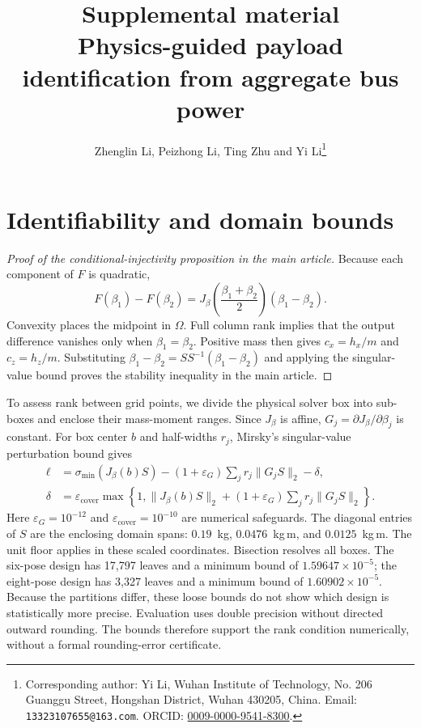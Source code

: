 \documentclass[12pt,a4paper]{article}
\title{Supplemental material\\[0.4em]\large Physics-guided payload identification from aggregate bus power}
\author{Zhenglin Li, Peizhong Li, Ting Zhu and Yi Li\thanks{Corresponding author: Yi Li, Wuhan Institute of Technology, No. 206 Guanggu Street, Hongshan District, Wuhan 430205, China. Email: \texttt{13323107655@163.com}. ORCID: \href{https://orcid.org/0009-0000-9541-8300}{0009-0000-9541-8300}.}}
\date{}
\begin{document}
\maketitle
\linenumbers
\setcounter{section}{0}
\setcounter{equation}{0}
\setcounter{table}{0}
\renewcommand{\thesection}{S\arabic{section}}
\renewcommand{\theequation}{S\arabic{equation}}
\renewcommand{\thetable}{S\arabic{table}}

\section{Identifiability and domain bounds}
\label{app:pvi_certificate}

\begin{proof}[Proof of the conditional-injectivity proposition in the main article]
Because each component of $F$ is quadratic,
\begin{equation}
F(\beta_1)-F(\beta_2)=
J_\beta\!\left(\frac{\beta_1+\beta_2}{2}\right)(\beta_1-\beta_2).
\label{eq:pvi_midpoint}
\end{equation}
Convexity places the midpoint in $\Omega$. Full column rank implies that
the output difference vanishes only when $\beta_1=\beta_2$. Positive mass
then gives $c_x=h_x/m$ and $c_z=h_z/m$. Substituting
$\beta_1-\beta_2=S S^{-1}(\beta_1-\beta_2)$ and applying the singular-value
bound proves the stability inequality in the main article.
\end{proof}

To assess rank between grid points, we divide the physical solver box into
sub-boxes and enclose their mass-moment ranges. Since $J_\beta$ is affine,
$G_j=\partial J_\beta/\partial\beta_j$ is constant. For box center $b$ and
half-widths $r_j$, Mirsky's singular-value perturbation bound gives
\begin{align}
\ell&=\sigma_{\min}(J_\beta(b)S)
-(1+\varepsilon_G)\sum_j r_j\|G_jS\|_2-\delta,
\label{eq:pvi_box_bound}\\
\delta&=\varepsilon_{\mathrm{cover}}\max\!\left\{
1,\|J_\beta(b)S\|_2+(1+\varepsilon_G)\sum_jr_j\|G_jS\|_2\right\}.
\label{eq:cover_numerical_margin}
\end{align}
Here $\varepsilon_G=10^{-12}$ and $\varepsilon_{\mathrm{cover}}=10^{-10}$
are numerical safeguards. The diagonal entries of $S$ are the enclosing
domain spans: $0.19$~kg, $0.0476$~kg\,m, and $0.0125$~kg\,m. The unit floor
applies in these scaled coordinates. Bisection resolves all boxes. The
six-pose design has 17,797 leaves and a minimum bound of
$1.59647\times10^{-5}$; the eight-pose design has 3,327 leaves and a minimum
bound of $1.60902\times10^{-5}$. Because the partitions differ, these loose
bounds do not show which design is statistically more precise. Evaluation uses double precision
without directed outward rounding. The bounds therefore support the rank
condition numerically, without a formal rounding-error certificate.
\end{document}

